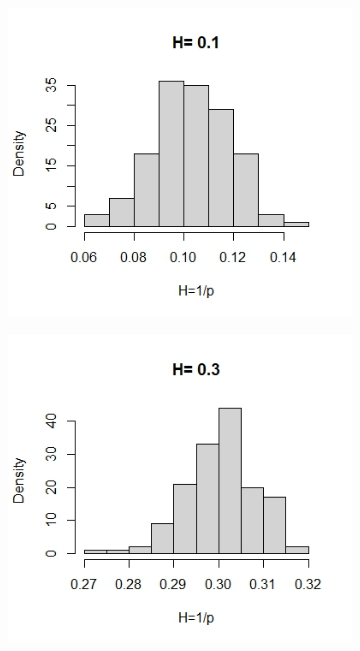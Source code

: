 \documentclass{article}
\begin{document}
\begin{figure}[htbp]
    \centering
    
    \begin{subfigure}{0.48\textwidth}
        \includegraphics[width=\linewidth]{hist_H01.jpeg}
    \end{subfigure}
    \hfill
    \begin{subfigure}{0.48\textwidth}
        \includegraphics[width=\linewidth]{hist_H03.jpeg}

\end{subfigure}
\end{figure}
\end{document}
